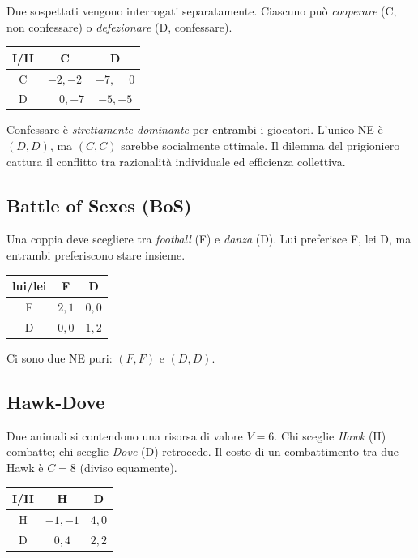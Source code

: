 \documentclass[12pt,a4paper,twoside]{book}
\theoremstyle{plain}
\theoremstyle{definition}
\begin{document}
Due sospettati vengono interrogati separatamente. Ciascuno può \emph{cooperare} (C, non confessare) o \emph{defezionare} (D, confessare).

\begin{center}
\begin{tabular}{c|cc}
I/II & C & D \\\hline
C & $-2,-2$ & $-7,\phantom{-}0$ \\
D & $\phantom{-}0,-7$ & $-5,-5$
\end{tabular}
\end{center}

Confessare è \emph{strettamente dominante} per entrambi i giocatori. L'unico NE è $(D,D)$, ma $(C,C)$ sarebbe socialmente ottimale. Il dilemma del prigioniero cattura il conflitto tra razionalità individuale ed efficienza collettiva.

\subsection{Battle of Sexes (BoS)}

Una coppia deve scegliere tra \emph{football} (F) e \emph{danza} (D). Lui preferisce F, lei D, ma entrambi preferiscono stare insieme.

\begin{center}
\begin{tabular}{c|cc}
lui/lei & F & D \\\hline
F & $2,1$ & $0,0$ \\
D & $0,0$ & $1,2$
\end{tabular}
\end{center}

Ci sono due NE puri: $(F,F)$ e $(D,D)$.

\subsection{Hawk-Dove}

Due animali si contendono una risorsa di valore $V=6$. Chi sceglie \emph{Hawk} (H) combatte; chi sceglie \emph{Dove} (D) retrocede. Il costo di un combattimento tra due Hawk è $C=8$ (diviso equamente).

\begin{center}
\begin{tabular}{c|cc}
I/II & H & D \\\hline
H & $-1,-1$ & $4,0$ \\
D & $0,4$ & $2,2$
\end{tabular}
\end{center}
\end{document}

